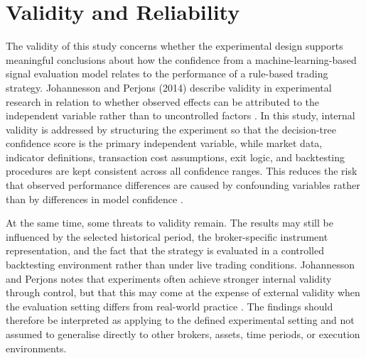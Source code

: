 




\section{Validity and Reliability}

The validity of this study concerns whether the experimental design supports
meaningful conclusions about how the confidence from a machine-learning-based
signal evaluation model relates to the performance of a rule-based trading
strategy. Johannesson and Perjons (2014) describe validity in experimental
research in relation to whether observed effects can be attributed to the
independent variable rather than to uncontrolled factors
\citep{johannesson2014design}. In this study, internal validity is addressed by
structuring the experiment so that the decision-tree confidence score is the
primary independent variable, while market data, indicator definitions,
transaction cost assumptions, exit logic, and backtesting procedures are kept
consistent across all confidence ranges. This reduces the risk that observed
performance differences are caused by confounding variables rather than by
differences in model confidence \citep{johannesson2014design}.

At the same time, some threats to validity remain. The results may still be
influenced by the selected historical period, the broker-specific instrument
representation, and the fact that the strategy is evaluated in a controlled
backtesting environment rather than under live trading conditions. Johannesson
and Perjons notes that experiments often achieve stronger internal validity
through control, but that this may come at the expense of external validity
when the evaluation setting differs from real-world practice
\citep{johannesson2014design}. The findings should therefore be interpreted as
applying to the defined experimental setting and not assumed to generalise
directly to other brokers, assets, time periods, or execution environments.

